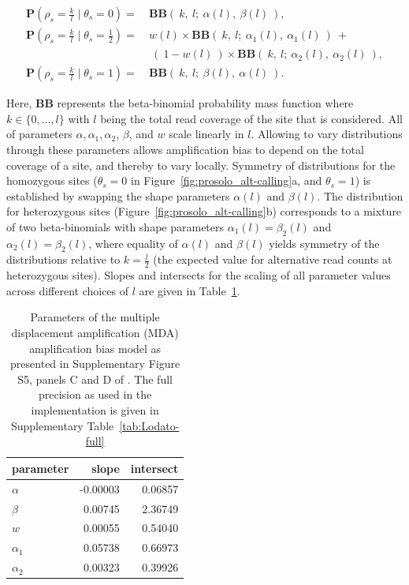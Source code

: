 \documentclass[12pt,inline]{wlscirep}
\newcommand{\Prob}{{\mathbf{P}}}
\newcommand{\cB}{{\mathbf{B}}}
\begin{document}
\begin{equation}
	\label{eq:BBLodato}
	\begin{split}
		\Prob(\rho_s = \frac{k}{l} \mid \theta_s = 0 ) 			=~ &\cB\cB(~ k,~ l;~ \alpha(l),~ \beta(l)~ ),\\
		\Prob(\rho_s = \frac{k}{l} \mid \theta_s = \frac12) =~ &w(l) \times \cB\cB(~ k,~ l;~ \alpha_1(l),~ \alpha_1(l)~ )~ +\\
                                                       ~&~(~ 1-w(l)~ ) \times \cB\cB(~ k,~ l;~ \alpha_2(l),~ \alpha_2(l)~ ),\\
		\Prob(\rho_s = \frac{k}{l} \mid \theta_s = 1 ) 			=~ &\cB\cB(~ k,~ l;~ \beta(l),~ \alpha(l)~ ).
	\end{split}
\end{equation}

Here, $\cB\cB$ represents the beta-binomial probability mass function where $k\in\{0,...,l\}$ with $l$ being the total read coverage of the site that is considered. All of parameters $\alpha, \alpha_1,\alpha_2$, $\beta$, and $w$ scale linearly in $l$.
Allowing to vary distributions through these parameters allows amplification bias to depend on the total coverage of a site, and thereby to vary locally.
Symmetry of distributions for the homozygous sites ($\theta_s = 0$ in Figure~\ref{fig:prosolo_alt-calling}a, and $\theta_s = 1$) is established by swapping the shape parameters $\alpha(l)$ and $\beta(l)$.
The distribution for heterozygous sites (Figure~\ref{fig:prosolo_alt-calling}b) corresponds to a mixture of two beta-binomials with shape parameters $\alpha_1(l)=\beta_2(l)$ and $\alpha_2(l)=\beta_2(l)$, where equality of $\alpha(l)$ and $\beta(l)$ yields symmetry of the distributions relative to $k = \frac{l}{2}$ (the expected value for alternative read counts at heterozygous sites).
Slopes and intersects for the scaling of all parameter values across different choices of $l$ are given in Table~\ref{tab:Lodato}.

\begin{table}[tbp]
 \caption{
 Parameters of the multiple displacement amplification (MDA) amplification bias model as presented in Supplementary Figure S5, panels C and D of \cite{lodato_somatic_2015}.
 The full precision as used in the implementation is given in Supplementary Table~\ref{tab:Lodato-full}
 }
 \label{tab:Lodato}
 \renewcommand{\arraystretch}{1.15}

 \begin{center}
  \begin{tabular}{lrr}
   parameter  & slope        & intersect   \\
   \toprule
   $\alpha$   & -0.00003 & 0.06857 \\
   $\beta$    & 0.00745  & 2.36749 \\
   \midrule
   $w$        & 0.00055  & 0.54040 \\
   $\alpha_1$ & 0.05738  & 0.66973 \\
   $\alpha_2$ & 0.00323  & 0.39926 \\
   \bottomrule
  \end{tabular}
 \end{center}
\end{table}
\end{document}
